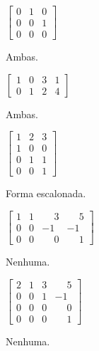 \documentclass[12pt]{exam}
\begin{document}
\begin{multicols}{2}
    \begin{exercicio}
        $\begin{bmatrix}0 & 1 & 0\\0 & 0 & 1\\0 & 0 & 0\end{bmatrix}$
        \begin{solucao}
            Ambas.
        \end{solucao}
    \end{exercicio}

    \begin{exercicio}
        $\begin{bmatrix}1 & 0 & 3 & 1\\0 & 1 & 2 & 4\end{bmatrix}$
        \begin{solucao}
            Ambas.
        \end{solucao}
    \end{exercicio}

    \begin{exercicio}
        $\begin{bmatrix}1 & 2 & 3\\1 & 0 & 0\\0 & 1 & 1\\0 & 0 & 1\end{bmatrix}$
        \begin{solucao}
            Forma escalonada.
        \end{solucao}
    \end{exercicio}

    \begin{exercicio}
    $\begin{bmatrix}1 & 1 & \phantom{-} 3 & \phantom{-} 5\\0 & 0 & -1 & -1\\0 & 0 & \phantom{-} 0 & \phantom{-} 1\end{bmatrix}$
    \begin{solucao}
        Nenhuma.
    \end{solucao}
\end{exercicio}

    \begin{exercicio}\label{fimverificamatrizes}
        $\begin{bmatrix}2 & 1 & 3 & \phantom{-} 5\\0 & 0 & 1 & -1\\0 & 0 & 0 & \phantom{-} 0\\0 & 0 & 0 & \phantom{-} 1\end{bmatrix}$
        \begin{solucao}
            Nenhuma.
        \end{solucao}
    \end{exercicio}
\end{multicols}
\end{document}
